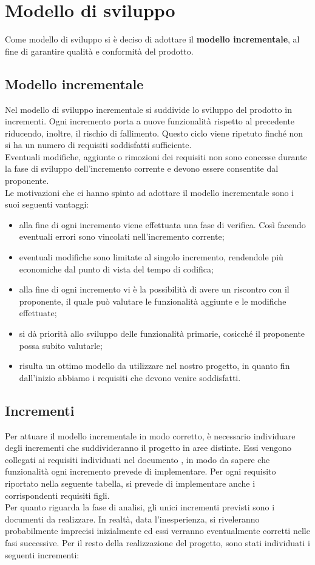 \section{Modello di sviluppo}
Come modello di sviluppo si è deciso di adottare il \textbf{modello incrementale}, al fine di garantire qualità e conformità del prodotto.

\subsection{Modello incrementale}
Nel modello di sviluppo incrementale si suddivide lo sviluppo del prodotto in incrementi. Ogni incremento porta a nuove funzionalità rispetto al precedente riducendo, inoltre, il rischio di fallimento. Questo ciclo viene ripetuto finché non si ha un numero di requisiti soddisfatti sufficiente.\\
Eventuali modifiche, aggiunte o rimozioni dei requisiti non sono concesse durante la fase di sviluppo dell'incremento corrente e devono essere consentite dal proponente.\\
Le motivazioni che ci hanno spinto ad adottare il modello incrementale sono i suoi seguenti vantaggi:
\begin{itemize}
\item alla fine di ogni incremento viene effettuata una fase di verifica. Così facendo eventuali errori sono vincolati nell'incremento corrente;
\item eventuali modifiche sono limitate al singolo incremento, rendendole più economiche dal punto di vista del tempo di codifica;
\item alla fine di ogni incremento vi è la possibilità di avere un riscontro con il proponente, il quale può valutare le funzionalità aggiunte e le modifiche effettuate;
\item si dà priorità allo sviluppo delle funzionalità primarie, cosicché il proponente possa subito valutarle;
\item risulta un ottimo modello da utilizzare nel nostro progetto, in quanto fin dall'inizio abbiamo i requisiti che devono venire soddisfatti.
\end{itemize}

\subsection{Incrementi}
Per attuare il modello incrementale in modo corretto, è necessario individuare degli incrementi che suddivideranno il progetto in aree distinte. Essi vengono collegati ai requisiti individuati nel documento , in modo da sapere che funzionalità ogni incremento prevede di implementare. Per ogni requisito riportato nella seguente tabella, si prevede di implementare anche i corrispondenti requisiti figli. \\
Per quanto riguarda la fase di analisi, gli unici incrementi previsti sono i documenti da realizzare. In realtà, data l'inesperienza, si riveleranno probabilmente imprecisi inizialmente ed essi verranno eventualmente corretti nelle fasi successive.
Per il resto della realizzazione del progetto, sono stati individuati i seguenti incrementi:

